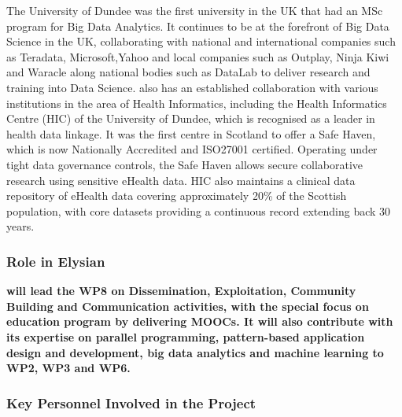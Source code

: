 \documentclass[a4paper,11pt]{article}
\begin{document}
The University of Dundee was the first university in the UK that had an MSc program for Big Data Analytics. It continues to be at the forefront of Big Data Science in the UK, collaborating with national and international companies such as Teradata, Microsoft,Yahoo and local companies such as Outplay, Ninja Kiwi and Waracle along national bodies such as DataLab to deliver research and training into Data Science. \UODshort{} also has an established collaboration with various institutions in the area of Health Informatics, including the Health Informatics Centre (HIC) of the University of Dundee, which is recognised as a leader in health data linkage. It was the first centre in Scotland to offer a Safe Haven, which is now Nationally Accredited and ISO27001 certified. Operating under tight data governance controls, the Safe Haven allows secure collaborative research using sensitive eHealth data. HIC also maintains a clinical data repository of eHealth data covering approximately 20\% of the Scottish population, with core datasets providing a continuous record extending back 30 years.

\subsubsection*{Role in Elysian}
\textbf{\UODshort{} will lead the WP8 on Dissemination, Exploitation, Community Building and Communication activities, with the special focus on education program by delivering MOOCs. It will also contribute with its expertise on parallel programming, pattern-based application design and development, big data analytics and machine learning to WP2, WP3 and WP6.}  

\subsubsection*{Key Personnel Involved in the Project}
\end{document}
